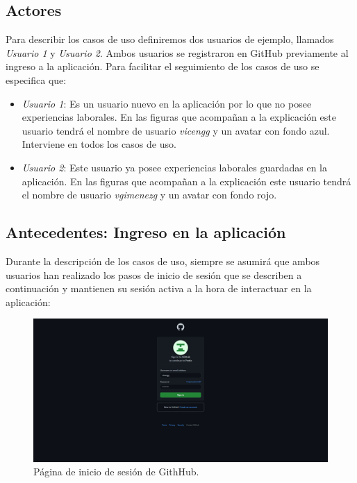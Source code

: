 \documentclass[a4paper, 12pt]{book}
\begin{document}
    \subsection{Actores}
    \label{subsec:actors}
    Para describir los casos de uso definiremos dos usuarios de ejemplo, llamados \emph{Usuario 1} y \emph{Usuario 2}.
    Ambos usuarios se registraron en GitHub previamente al ingreso a la aplicación. Para facilitar el seguimiento de los casos
    de uso se especifica que:
    \begin{itemize}
        \item \emph{Usuario 1}: Es un usuario nuevo en la aplicación por lo que no posee experiencias laborales.
        En las figuras que acompañan a la explicación este usuario tendrá el nombre de usuario \emph{vicengg} y un avatar con fondo azul.
        Interviene en todos los casos de uso.
        \item \emph{Usuario 2}: Este usuario ya posee experiencias laborales guardadas en la aplicación.
        En las figuras que acompañan a la explicación este usuario tendrá el nombre de usuario \emph{vgimenezg} y un avatar con fondo rojo.
    \end{itemize}

    \subsection{Antecedentes: Ingreso en la aplicación}
    \label{subsec:background}
    Durante la descripción de los casos de uso, siempre se asumirá que ambos usuarios han realizado los pasos de inicio de sesión
    que se describen a continuación y mantienen su sesión activa a la hora de interactuar en la aplicación:

    \begin{figure}
        \centering
        \includegraphics[width=15cm, keepaspectratio]{img/0.1.png}
        \caption{Página de inicio de sesión de GithHub.}\label{fig:use_cases_0_1}
    \end{figure}
\end{document}
